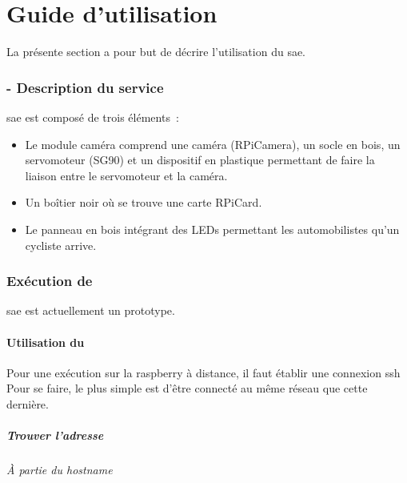 \part{Guide d'utilisation}
La présente section a pour but de décrire l'utilisation du \gls{sae}.

\section{ - Description du service}
\label{sec:description_clearWay}

\gls{sae} est composé de trois éléments :
\begin{itemize}
    \item Le module caméra comprend une caméra (\gls{RPiCamera}), un socle en bois, un servomoteur (\gls{SG90})
          et un dispositif en plastique permettant de faire la liaison entre le servomoteur et la caméra.
    \item Un boîtier noir où se trouve une carte \gls{RPiCard}.
    \item Le panneau en bois intégrant des LEDs permettant les automobilistes qu'un cycliste arrive.
\end{itemize}

\section{Exécution de }
\label{sec:execution_clearWay}

\gls{sae} est actuellement un prototype.

\subsection{Utilisation du }
\label{sec:utilisationSSH}

Pour une exécution sur la \gls{raspberry} à distance, il faut établir une connexion \gls{ssh}
Pour se faire, le plus simple est d'être connecté au même réseau que cette dernière.

\subsubsection{Trouver l'adresse }
\label{sec:trouverIP}

\paragraph{À partie du \textit{hostname}}

